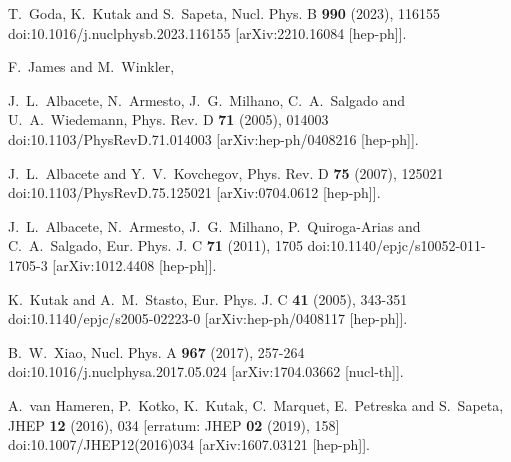 T.~Goda, K.~Kutak and S.~Sapeta,
Nucl. Phys. B \textbf{990} (2023), 116155
doi:10.1016/j.nuclphysb.2023.116155
[arXiv:2210.16084 [hep-ph]].

F.~James and M.~Winkler,

J.~L.~Albacete, N.~Armesto, J.~G.~Milhano, C.~A.~Salgado and U.~A.~Wiedemann,
Phys. Rev. D \textbf{71} (2005), 014003
doi:10.1103/PhysRevD.71.014003
[arXiv:hep-ph/0408216 [hep-ph]].

J.~L.~Albacete and Y.~V.~Kovchegov,
Phys. Rev. D \textbf{75} (2007), 125021
doi:10.1103/PhysRevD.75.125021
[arXiv:0704.0612 [hep-ph]].

J.~L.~Albacete, N.~Armesto, J.~G.~Milhano, P.~Quiroga-Arias and C.~A.~Salgado,
Eur. Phys. J. C \textbf{71} (2011), 1705
doi:10.1140/epjc/s10052-011-1705-3
[arXiv:1012.4408 [hep-ph]].

K.~Kutak and A.~M.~Stasto,
Eur. Phys. J. C \textbf{41} (2005), 343-351
doi:10.1140/epjc/s2005-02223-0
[arXiv:hep-ph/0408117 [hep-ph]].

B.~W.~Xiao,
Nucl. Phys. A \textbf{967} (2017), 257-264
doi:10.1016/j.nuclphysa.2017.05.024
[arXiv:1704.03662 [nucl-th]].

A.~van Hameren, P.~Kotko, K.~Kutak, C.~Marquet, E.~Petreska and S.~Sapeta,
JHEP \textbf{12} (2016), 034
[erratum: JHEP \textbf{02} (2019), 158]
doi:10.1007/JHEP12(2016)034
[arXiv:1607.03121 [hep-ph]].

